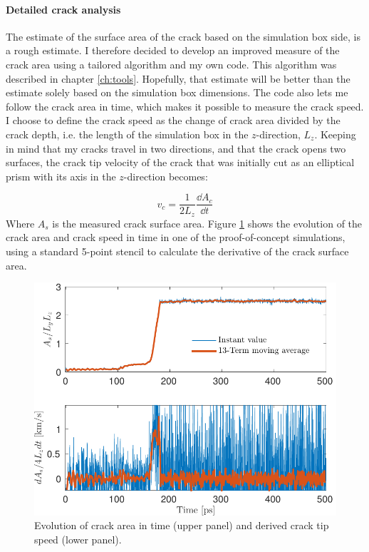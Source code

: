 \paragraph{Detailed crack analysis}
The estimate of the surface area of the crack based on the simulation box side, is a rough estimate. I therefore decided to develop an improved measure of the crack area using a tailored algorithm and my own code. This algorithm was described in chapter \ref{ch:tools}. Hopefully, that estimate will be better than the estimate solely based on the simulation box dimensions. The code also lets me follow the crack area in time, which makes it possible to measure the crack speed. I choose to define the crack speed as the change of crack area divided by the crack depth, i.e. the length of the simulation box in the $z$-direction, $L_z$. Keeping in mind that my cracks travel in two directions, and that the crack opens two surfaces, the crack tip velocity of the crack that was initially cut as an elliptical prism with its axis in the $z$-direction becomes:

\begin{equation}
v_c = \frac{1}{2L_z}\frac{\dd A_c}{\dd t}
\end{equation}
%
Where $A_s$ is the measured crack surface area. Figure \ref{fig:crack_in_time_thin} shows the evolution of the crack area and crack speed in time in one of the proof-of-concept simulations, using a standard 5-point stencil to calculate the derivative of the crack surface area.
\begin{figure}
\centering
\includegraphics[width=12cm]{../figures/thesis/crack_in_time_thin.pdf}
\caption{Evolution of crack area in time (upper panel) and derived crack tip speed (lower panel).}
\label{fig:crack_in_time_thin}
\end{figure}

